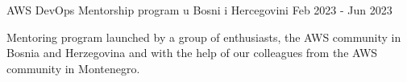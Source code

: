 

\begin{cventries}



    \cventry
    {} %
    {AWS DevOps Mentorship program u Bosni i Hercegovini} %
    {} %
    {Feb 2023 - Jun 2023} %
    {
      \begin{cvitems} %
          Mentoring program launched by a group of enthusiasts, the AWS community in Bosnia and Herzegovina and with the help of our colleagues from the AWS community in Montenegro.
      \end{cvitems}
    }


\end{cventries}
